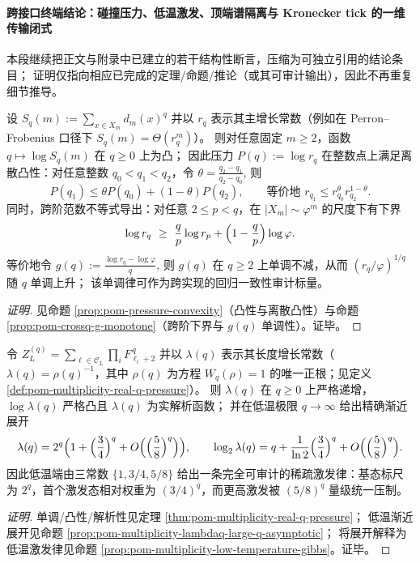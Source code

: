 
\paragraph{跨接口终端结论：碰撞压力、低温激发、顶端谱隔离与 Kronecker tick 的一维传输闭式}
本段继续把正文与附录中已建立的若干结构性断言，压缩为可独立引用的结论条目；
证明仅指向相应已完成的定理/命题/推论（或其可审计输出），因此不再重复细节推导。

\begin{conclusion}\label{con:xi-terminal-collision-pressure-discrete-convexity-crossq-g}
设
\(
S_q(m):=\sum_{x\in X_m}d_m(x)^q
\)
并以 \(r_q\) 表示其主增长常数（例如在 Perron--Frobenius 口径下 \(S_q(m)=\Theta(r_q^m)\)）。
则对任意固定 \(m\ge 2\)，函数 \(q\mapsto \log S_q(m)\) 在 \(q\ge 0\) 上为凸；
因此压力 \(P(q):=\log r_q\) 在整数点上满足离散凸性：对任意整数 \(q_0<q_1<q_2\)，令
\(
\theta=\frac{q_2-q_1}{q_2-q_0}
\),
则
\[
P(q_1)\le \theta P(q_0)+(1-\theta)P(q_2),
\qquad
\text{等价地 } r_{q_1}\le r_{q_0}^{\theta}r_{q_2}^{1-\theta}.
\]
同时，跨阶范数不等式导出：对任意 \(2\le p<q\)，在 \(|X_m|\sim\varphi^m\) 的尺度下有下界
\[
\log r_q \ \ge\ \frac{q}{p}\log r_p+\Bigl(1-\frac{q}{p}\Bigr)\log\varphi.
\]
等价地令
\(
g(q):=\frac{\log r_q-\log\varphi}{q}
\),
则 \(g(q)\) 在 \(q\ge 2\) 上单调不减，从而 \((r_q/\varphi)^{1/q}\) 随 \(q\) 单调上升；
该单调律可作为跨实现的回归一致性审计标量。
\end{conclusion}
\begin{proof}[证明]
见命题 \ref{prop:pom-pressure-convexity}（凸性与离散凸性）与命题 \ref{prop:pom-crossq-g-monotone}（跨阶下界与 \(g(q)\) 单调性）。证毕。
\end{proof}

\begin{conclusion}[低温端的严格稀疏激发律：\texorpdfstring{$\lambda(q)=2^q\bigl(1+(3/4)^q+O((5/8)^q)\bigr)$}{lambda(q)=2^q(1+(3/4)^q+O((5/8)^q))}]\label{con:xi-terminal-low-temperature-sparse-excitation-law}
令
\(
Z_L^{(q)}=\sum_{\boldsymbol{\ell}\in \mathcal C_L}\prod_i F_{\ell_i+2}^{\,q}
\)
并以 \(\lambda(q)\) 表示其长度增长常数（\(\lambda(q)=\rho(q)^{-1}\)，其中 \(\rho(q)\) 为方程 \(W_q(\rho)=1\) 的唯一正根；见定义 \ref{def:pom-multiplicity-real-q-pressure}）。
则 \(\lambda(q)\) 在 \(q\ge 0\) 上严格递增，\(\log\lambda(q)\) 严格凸且 \(\lambda(q)\) 为实解析函数；
并在低温极限 \(q\to\infty\) 给出精确渐近展开
\[
\lambda(q)=2^q\Bigl(1+\Bigl(\frac34\Bigr)^q+O\Bigl(\Bigl(\frac58\Bigr)^q\Bigr)\Bigr),
\qquad
\log_2\lambda(q)=q+\frac{1}{\ln 2}\Bigl(\frac34\Bigr)^q+O\Bigl(\Bigl(\frac58\Bigr)^q\Bigr).
\]
因此低温端由三常数 \(\{1,3/4,5/8\}\) 给出一条完全可审计的稀疏激发律：基态标尺为 \(2^q\)，首个激发态相对权重为 \((3/4)^q\)，而更高激发被 \((5/8)^q\) 量级统一压制。
\end{conclusion}
\begin{proof}[证明]
单调/凸性/解析性见定理 \ref{thm:pom-multiplicity-real-q-pressure}；
低温渐近展开见命题 \ref{prop:pom-multiplicity-lambdaq-large-q-asymptotic}；
将展开解释为低温激发律见命题 \ref{prop:pom-multiplicity-low-temperature-gibbs}。证毕。
\end{proof}

